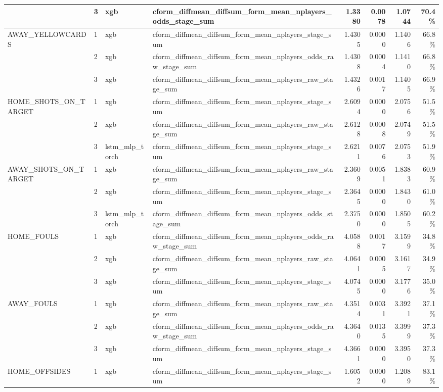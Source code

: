 \begin{table}[ht]
\begin{tabular}{llllrrrr}
 & 3 & xgb & cform_diffmean_diffsum_form_mean_nplayers_odds_stage_sum & 1.3380 & 0.0078 & 1.0744 & 70.4\% \\
\midrule
AWAY\_YELLOWCARDS & 1 & xgb & cform_diffmean_diffsum_form_mean_nplayers_stage_sum & 1.4305 & 0.0000 & 1.1406 & 66.8\% \\
 & 2 & xgb & cform_diffmean_diffsum_form_mean_nplayers_odds_raw_stage_sum & 1.4308 & 0.0004 & 1.1410 & 66.8\% \\
 & 3 & xgb & cform_diffmean_diffsum_form_mean_nplayers_raw_stage_sum & 1.4326 & 0.0017 & 1.1405 & 66.9\% \\
\midrule
HOME\_SHOTS\_ON\_TARGET & 1 & xgb & cform_diffmean_diffsum_form_mean_nplayers_stage_sum & 2.6094 & 0.0000 & 2.0756 & 51.5\% \\
 & 2 & xgb & cform_diffmean_diffsum_form_mean_nplayers_raw_stage_sum & 2.6128 & 0.0008 & 2.0749 & 51.5\% \\
 & 3 & lstm\_mlp\_torch & cform_diffmean_diffsum_form_mean_nplayers_stage_sum & 2.6211 & 0.0076 & 2.0753 & 51.9\% \\
\midrule
AWAY\_SHOTS\_ON\_TARGET & 1 & xgb & cform_diffmean_diffsum_form_mean_nplayers_raw_stage_sum & 2.3609 & 0.0051 & 1.8383 & 60.9\% \\
 & 2 & xgb & cform_diffmean_diffsum_form_mean_nplayers_stage_sum & 2.3645 & 0.0000 & 1.8430 & 61.0\% \\
 & 3 & lstm\_mlp\_torch & cform_diffmean_diffsum_form_mean_nplayers_odds_stage_sum & 2.3750 & 0.0000 & 1.8505 & 60.2\% \\
\midrule
HOME\_FOULS & 1 & xgb & cform_diffmean_diffsum_form_mean_nplayers_odds_raw_stage_sum & 4.0588 & 0.0017 & 3.1599 & 34.8\% \\
 & 2 & xgb & cform_diffmean_diffsum_form_mean_nplayers_raw_stage_sum & 4.0641 & 0.0005 & 3.1617 & 34.9\% \\
 & 3 & xgb & cform_diffmean_diffsum_form_mean_nplayers_stage_sum & 4.0745 & 0.0000 & 3.1776 & 35.0\% \\
\midrule
AWAY\_FOULS & 1 & xgb & cform_diffmean_diffsum_form_mean_nplayers_raw_stage_sum & 4.3514 & 0.0031 & 3.3921 & 37.1\% \\
 & 2 & xgb & cform_diffmean_diffsum_form_mean_nplayers_odds_raw_stage_sum & 4.3640 & 0.0135 & 3.3999 & 37.3\% \\
 & 3 & xgb & cform_diffmean_diffsum_form_mean_nplayers_stage_sum & 4.3661 & 0.0000 & 3.3950 & 37.3\% \\
\midrule
HOME\_OFFSIDES & 1 & xgb & cform_diffmean_diffsum_form_mean_nplayers_stage_sum & 1.6052 & 0.0000 & 1.2089 & 83.1\% \\

\end{tabular}
\end{table}
